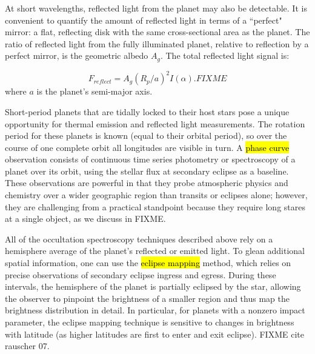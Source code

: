 \documentclass[graybox,natbib,nosecnum]{svmult}
\newcommand{\hbindex}[1]{\hl{#1}\index{#1}}  %
\begin{document}

At short wavelengths, reflected light from the planet may also be detectable. It is convenient to quantify the amount of reflected light in terms of a ``perfect" mirror: a flat, reflecting disk with the same cross-sectional area as the planet. The ratio of reflected light from the fully illuminated planet, relative to reflection by a perfect mirror, is the geometric albedo $A_g$. The total reflected light signal is:

\begin{equation}
F_{reflect} = A_g(R_p/a)^2 I(\alpha). FIXME
\end{equation}
where $a$ is the planet's semi-major axis.

Short-period planets that are tidally locked to their host stars pose a unique opportunity for thermal emission and reflected light measurements. The rotation period for these planets is known (equal to their orbital period), so over the course of one complete orbit all longitudes are visible in turn. A \hbindex{phase curve} observation consists of continuous time series photometry or spectroscopy of a planet over its orbit, using the stellar flux at secondary eclipse as a baseline. These observations are powerful in that they probe atmospheric physics and chemistry over a wider geographic region than transits or eclipses alone; however, they are challenging from a practical standpoint because they require long stares at a single object, as we discuss in FIXME. %

All of the occultation spectroscopy techniques described above rely on a hemisphere average of the planet's reflected or emitted light. To glean additional spatial information, one can use the \hbindex{eclipse mapping} method, which relies on precise observations of secondary eclipse ingress and egress.  During these intervals, the hemisphere of the planet is partially eclipsed by the star, allowing the observer to pinpoint the brightness of a smaller region and thus map the brightness distribution in detail. In particular, for planets with a nonzero impact parameter, the eclipse mapping technique is sensitive to changes in brightness with latitude (as higher latitudes are first to enter and exit eclipse). FIXME cite rauscher 07.
\end{document}
